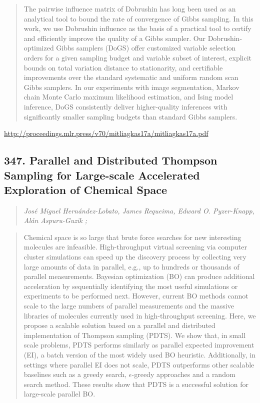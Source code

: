 \documentclass{article}
\begin{document}
\begin{quote}
    The pairwise influence matrix of Dobrushin has long been used as an analytical tool to bound the rate of convergence of Gibbs sampling. In this work, we use Dobrushin influence as the basis of a practical tool to certify and efficiently improve the quality of a Gibbs sampler. Our Dobrushin-optimized Gibbs samplers (DoGS) offer customized variable selection orders for a given sampling budget and variable subset of interest, explicit bounds on total variation distance to stationarity, and certifiable improvements over the standard systematic and uniform random scan Gibbs samplers. In our experiments with image segmentation, Markov chain Monte Carlo maximum likelihood estimation, and Ising model inference, DoGS consistently deliver higher-quality inferences with significantly smaller sampling budgets than standard Gibbs samplers.  
\end{quote}

\href{http://proceedings.mlr.press/v70/mitliagkas17a/mitliagkas17a.pdf}{http://proceedings.mlr.press/v70/mitliagkas17a/mitliagkas17a.pdf}

\subsection{347. Parallel and Distributed Thompson Sampling for Large-scale Accelerated Exploration of Chemical Space}

\begin{quote}
\footnotesize{\textit{José Miguel Hernández-Lobato, James Requeima, Edward O. Pyzer-Knapp, Alán Aspuru-Guzik ;}}

\end{quote}

\begin{quote}
    Chemical space is so large that brute force searches for new interesting molecules are infeasible. High-throughput virtual screening via computer cluster simulations can speed up the discovery process by collecting very large amounts of data in parallel, e.g., up to hundreds or thousands of parallel measurements. Bayesian optimization (BO) can produce additional acceleration by sequentially identifying the most useful simulations or experiments to be performed next. However, current BO methods cannot scale to the large numbers of parallel measurements and the massive libraries of molecules currently used in high-throughput screening. Here, we propose a scalable solution based on a parallel and distributed implementation of Thompson sampling (PDTS). We show that, in small scale problems, PDTS performs similarly as parallel expected improvement (EI), a batch version of the most widely used BO heuristic. Additionally, in settings where parallel EI does not scale, PDTS outperforms other scalable baselines such as a greedy search, $\epsilon$-greedy approaches and a random search method. These results show that PDTS is a successful solution for large-scale parallel BO.  
\end{quote}
\end{document}
